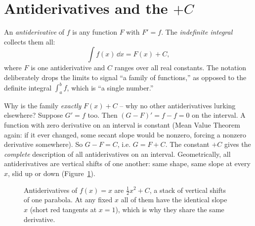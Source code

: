 \section{Antiderivatives and the $+C$}

An \emph{antiderivative} of $f$ is any function $F$ with $F'=f$. The
\emph{indefinite integral} collects them all:
\[
  \int f(x)\,\dd x = F(x) + C ,
\]
where $F$ is one antiderivative and $C$ ranges over all real constants. The
notation deliberately drops the limits to signal ``a family of functions,'' as
opposed to the definite integral $\int_a^b f$, which is ``a single number.''

\begin{whybox}
Why is the family \emph{exactly} $F(x)+C$ -- why no other antiderivatives lurking
elsewhere? Suppose $G'=f$ too. Then $(G-F)'=f-f=0$ on the interval. A function
with zero derivative on an interval is constant (Mean Value Theorem again: if it
ever changed, some secant slope would be nonzero, forcing a nonzero derivative
somewhere). So $G-F=C$, i.e. $G=F+C$. The constant $+C$ gives the
\emph{complete} description of all antiderivatives on an interval. Geometrically,
all antiderivatives are vertical shifts of one another: same shape, same slope at
every $x$, slid up or down (Figure~\ref{ch21:fig-plusC}).
\end{whybox}

\begin{figure}[H]
\centering
{}
\caption{Antiderivatives of $f(x)=x$ are $\tfrac12 x^2+C$, a stack of vertical
shifts of one parabola. At any fixed $x$ all of them have the identical slope $x$
(short red tangents at $x=1$), which is why they share the same derivative.}
\label{ch21:fig-plusC}
\end{figure}

